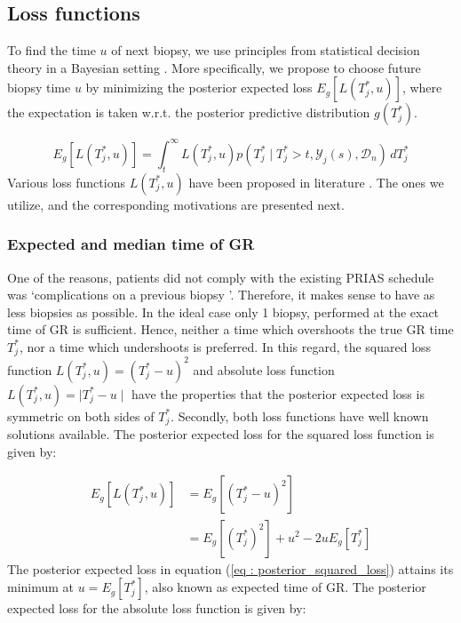 \subsection{Loss functions}
\label{subsec : loss_functions}
To find the time $u$ of next biopsy, we use principles from statistical decision theory in a Bayesian setting \citep{bergerDecisionTheory,robertBayesianChoice}. More specifically, we propose to choose future biopsy time $u$ by minimizing the posterior expected loss $E_g[L(T^*_j, u)]$, where the expectation is taken w.r.t. the posterior predictive distribution $g(T^*_j)$. 

\begin{equation*}
E_g[L(T^*_j, u)] = \int_t^\infty L(T^*_j, u) p(T^*_j \mid T^*_j > t, \mathcal{Y}_j(s), \mathcal{D}_n) \,dT^*_j
\end{equation*}
Various loss functions $L(T^*_j, u)$ have been proposed in literature \citep{robertBayesianChoice}. The ones we utilize, and the corresponding motivations are presented next.

\subsubsection{Expected and median time of GR}
\label{subsubsec : exp_median_fail_time}
One of the reasons, patients did not comply with the existing PRIAS schedule was \textquoteleft complications on a previous biopsy \textquoteright. Therefore, it makes sense to have as less biopsies as possible. In the ideal case only 1 biopsy, performed at the exact time of GR is sufficient. Hence, neither a time which overshoots the true GR time $T^*_j$, nor a time which undershoots is preferred. In this regard, the squared loss function $L(T^*_j, u) = (T^*_j - u)^2$ and absolute loss function $L(T^*_j, u) = \mid T^*_j - u \mid$ have the properties that the posterior expected loss is symmetric on both sides of $T^*_j$. Secondly, both loss functions have well known solutions available. The posterior expected loss for the squared loss function is given by:

\begin{equation}
\label{eq : posterior_squared_loss}
\begin{split}
E_g[L(T^*_j, u)] &= E_g[(T^*_j - u)^2]\\
&=E_g[(T^*_j)^2] + u^2 -2uE_g[T^*_j]
\end{split}
\end{equation}
The posterior expected loss in equation (\ref{eq : posterior_squared_loss}) attains its minimum at $u = E_g[T^*_j]$, also known as expected time of GR. The posterior expected loss for the absolute loss function is given by:

